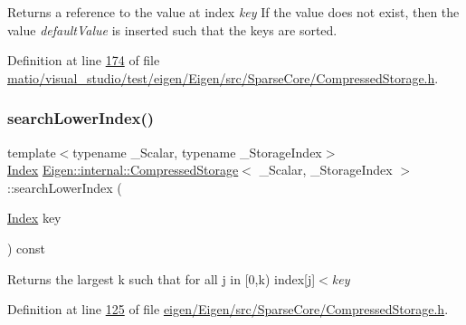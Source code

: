 \begin{DoxyReturn}{Returns}
a reference to the value at index {\itshape key} If the value does not exist, then the value {\itshape default\+Value} is inserted such that the keys are sorted. 
\end{DoxyReturn}


Definition at line \hyperlink{matio_2visual__studio_2test_2eigen_2_eigen_2src_2_sparse_core_2_compressed_storage_8h_source_l00174}{174} of file \hyperlink{matio_2visual__studio_2test_2eigen_2_eigen_2src_2_sparse_core_2_compressed_storage_8h_source}{matio/visual\+\_\+studio/test/eigen/\+Eigen/src/\+Sparse\+Core/\+Compressed\+Storage.\+h}.

\mbox{\label{class_eigen_1_1internal_1_1_compressed_storage_ad96105b5ab19886e96076513eab77da5}} 
\subsubsection{\texorpdfstring{search\+Lower\+Index()}{searchLowerIndex()}\hspace{0.1cm}{\footnotesize\ttfamily [1/4]}}
{\footnotesize\ttfamily template$<$typename \+\_\+\+Scalar, typename \+\_\+\+Storage\+Index$>$ \\
\hyperlink{namespace_eigen_a62e77e0933482dafde8fe197d9a2cfde}{Index} \hyperlink{class_eigen_1_1internal_1_1_compressed_storage}{Eigen\+::internal\+::\+Compressed\+Storage}$<$ \+\_\+\+Scalar, \+\_\+\+Storage\+Index $>$\+::search\+Lower\+Index (\begin{DoxyParamCaption}\item[{\hyperlink{namespace_eigen_a62e77e0933482dafde8fe197d9a2cfde}{Index}}]{key }\end{DoxyParamCaption}) const\hspace{0.3cm}{\ttfamily [inline]}}

\begin{DoxyReturn}{Returns}
the largest {\ttfamily k} such that for all {\ttfamily j} in \mbox{[}0,k) index\mbox{[}{\ttfamily j}\mbox{]}$<${\itshape key} 
\end{DoxyReturn}


Definition at line \hyperlink{eigen_2_eigen_2src_2_sparse_core_2_compressed_storage_8h_source_l00125}{125} of file \hyperlink{eigen_2_eigen_2src_2_sparse_core_2_compressed_storage_8h_source}{eigen/\+Eigen/src/\+Sparse\+Core/\+Compressed\+Storage.\+h}.

